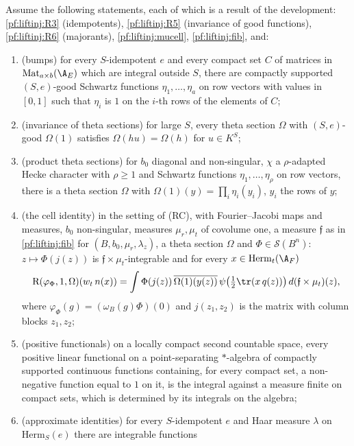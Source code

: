 \begin{proposition}\label{pf:liftinj:eismeas}
Assume the following statements, each of which is a result of the development: \ref{pf:liftinj:R3} (idempotents), \ref{pf:liftinj:R5} (invariance of good
functions), \ref{pf:liftinj:R6} (majorants), \cref{pf:liftinj:mucell}, \cref{pf:liftinj:fib}, and:
\begin{enumerate}[label=(\roman*)]
\item (bumps) for every $S$-idempotent $e$ and every compact set $C$ of matrices in $\mathrm{Mat}_{a\times b}(\A_E)$ which are integral outside $S$,
there are compactly supported $(S,e)$-good Schwartz functions $\eta_1,\dots,\eta_a$ on row vectors with values in $[0,1]$ such that $\eta_i$ is $1$ on
the $i$-th rows of the elements of $C$;
\item (invariance of theta sections) for large $S$, every theta section $\Omega$ with $(S,e)$-good $\Omega(1)$ satisfies $\Omega(hu)=\Omega(h)$ for
$u\in K^S$;
\item (product theta sections) for $b_0$ diagonal and non-singular, $\chi$ a $\rho$-adapted Hecke character with $\rho\ge1$ and Schwartz functions
$\eta_1,\dots,\eta_\rho$ on row vectors, there is a theta section $\Omega$ with $\Omega(1)(y)=\prod_i\eta_i(y_i)$, $y_i$ the rows of $y$;
\item (the cell identity) in the setting of (RC), with Fourier--Jacobi maps and measures, $b_0$ non-singular, measures $\mu_r,\mu_t$ of covolume one,
a measure $\mathfrak f$ as in \cref{pf:liftinj:fib} for $(B,b_0,\mu_r,\lambda_z)$, a theta section $\Omega$ and $\Phi\in\mathcal S(B^n)$:
$z\mapsto\Phi(j(z))$ is $\mathfrak f\times\mu_t$-integrable and for every $x\in\mathrm{Herm}_t(\A_F)$
\[
\mathrm R(\varphi_\Phi,1,\Omega)(w_t\,n(x))=\int\Phi(j(z))\,\overline{\Omega(1)(y(z))}\,\psi\bigl(\tfrac12\tr(x\,q(z))\bigr)\,d(\mathfrak f\times\mu_t)(z),
\]
where $\varphi_\Phi(g)=(\omega_B(g)\Phi)(0)$ and $j(z_1,z_2)$ is the matrix with column blocks $z_1,z_2$;
\item (positive functionals) on a locally compact second countable space, every positive linear functional on a point-separating $*$-algebra of
compactly supported continuous functions containing, for every compact set, a non-negative function equal to $1$ on it, is the integral against a
measure finite on compact sets, which is determined by its integrals on the algebra;
\item (approximate identities) for every $S$-idempotent $e$ and Haar measure $\lambda$ on $\mathrm{Herm}_S(e)$ there are integrable functions

\end{enumerate}
\end{proposition}
